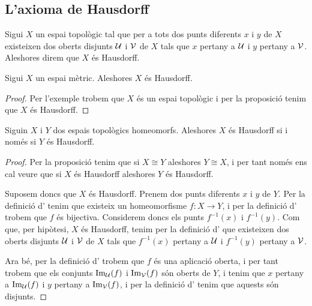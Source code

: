 \documentclass[../Apunts.tex]{subfiles}
\begin{document}
	\subsection{L'axioma de Hausdorff}
	\begin{definition}
		\label{def:espai Hausdorff}
		Sigui \(X\) un espai topològic tal que per a tots dos punts diferents \(x\) i \(y\) de \(X\) existeixen dos oberts disjunts \(\mathcal{U}\) i \(\mathcal{V}\) de \(X\) tals que \(x\) pertany a \(\mathcal{U}\) i \(y\) pertany a \(\mathcal{V}\). Aleshores direm que \(X\) és Hausdorff.
	\end{definition}
	\begin{proposition}
		\label{prop:els espais mètrics són Hausdorff}
		Sigui \(X\) un espai mètric. Aleshores \(X\) és Hausdorff.
		\begin{proof}
			Per l'exemple  trobem que \(X\) és un espai topològic i per la proposició  tenim que \(X\) és Hausdorff.
		\end{proof}
	\end{proposition}
	\begin{proposition}
		\label{prop:ser Hausdorff és una propietat topològica}
		Siguin \(X\) i \(Y\) dos espais topològics homeomorfs. Aleshores \(X\) és Hausdorff si i només si \(Y\) és Hausdorff.
		\begin{proof}
			Per la proposició  tenim que si \(X\cong Y\) aleshores \(Y\cong X\), i per tant només ens cal veure que si \(X\) és Hausdorff aleshores \(Y\) és Hausdorff.
			
			Suposem doncs que \(X\) és Hausdorff. Prenem dos punts diferents \(x\) i \(y\) de \(Y\). Per la definició d' tenim que existeix un homeomorfisme \(f\colon X\longrightarrow Y\), i per la definició d' trobem que \(f\) és bijectiva. Considerem doncs els punts \(f^{-1}(x)\) i \(f^{-1}(y)\). Com que, per hipòtesi, \(X\) és Hausdorff, tenim per la definició d' que existeixen dos oberts disjunts \(\mathcal{U}\) i \(\mathcal{V}\) de \(X\) tals que \(f^{-1}(x)\) pertany a \(\mathcal{U}\) i \(f^{-1}(y)\) pertany a \(\mathcal{V}\).
			
			Ara bé, per la definició d' trobem que \(f\) és una aplicació oberta, i per tant trobem que els conjunts \(\operatorname{Im}_{\mathcal{U}}(f)\) i \(\operatorname{Im}_{\mathcal{V}}(f)\) són oberts de \(Y\), i tenim que \(x\) pertany a \(\operatorname{Im}_{\mathcal{U}}(f)\) i \(y\) pertany a \(\operatorname{Im}_{\mathcal{V}}(f)\), i per la definició d' tenim que aquests són disjunts.
		\end{proof}
	\end{proposition}
\end{document}
